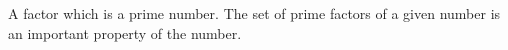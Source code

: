 A factor which is a prime number. The set of prime factors of a given number
is an important property of the number.